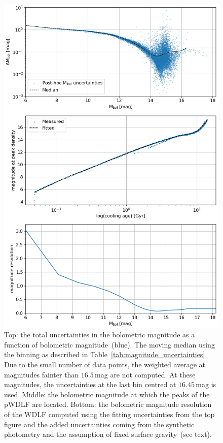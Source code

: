 \documentclass[fleqn,usenatbib]{mnras}
\begin{document}
\begin{figure}
    \includegraphics[width=\columnwidth]{figures/fig_03_mbol_sigma_magnitude_resoltuion.png}
    \caption{Top: the total uncertainties in the bolometric magnitude as a 
    function of bolometric magnitude~(blue). The moving median using the binning
    as described in Table~\ref{tab:magnitude_uncertainties} Due to the small
    number of data points, the weighted average at magnitudes fainter than
    $16.5$\,mag are not computed. At these magnitudes, the uncertainties at the
    last bin centred at $16.45$\,mag is used. Middle: the bolometric magnitude
    at which the peaks of the pWDLF are located. Bottom: the bolometric
    magnitude resolution of the WDLF computed using the fitting uncertainties
    from the top figure and the added uncertainties coming from the synthetic
    photometry and the assumption of fixed surface gravity~(see text).
    }
    \label{fig:magnitude_resolution}
\end{figure}
\end{document}
